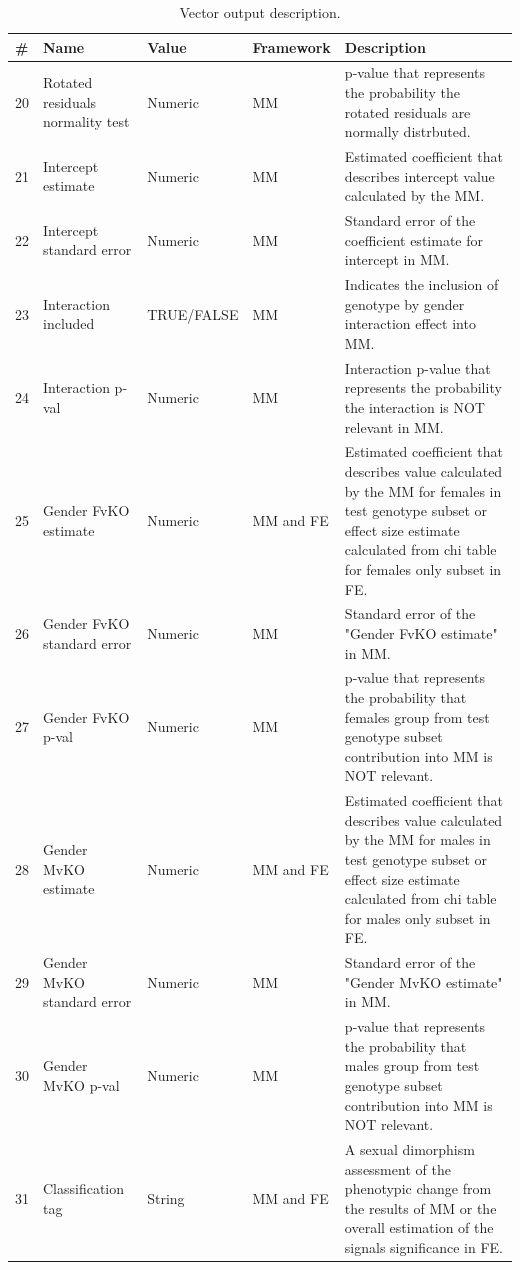 \documentclass[12pt,a4paper]{article}
\begin{document}
\begin{table}
 
\begin{tabular}{| l | l | l | l | p{10cm} |}
  \hline
\#&Name&Value&Framework&Description\\\hline
20&Rotated residuals normality test&Numeric&MM&p-value that represents the probability the rotated residuals are normally distrbuted.\\
21&Intercept estimate&Numeric&MM&Estimated coefficient that describes intercept value calculated by the MM.\\
22&Intercept standard error&Numeric&MM&Standard error of the coefficient estimate for intercept in MM.\\
23&Interaction included&TRUE/FALSE&MM&Indicates the inclusion of genotype by gender interaction effect into MM.\\
24&Interaction p-val&Numeric&MM&Interaction p-value that represents the probability the interaction is NOT relevant in MM.\\
25&Gender FvKO estimate&Numeric&MM and FE&Estimated coefficient that describes value calculated by the MM for females in test genotype subset or effect size estimate calculated from chi table for females only subset in FE.\\
26&Gender FvKO standard error&Numeric&MM&Standard error of the "Gender FvKO estimate" in MM.\\
27&Gender FvKO p-val&Numeric&MM&p-value that represents the probability that females group from test genotype subset contribution into MM is NOT relevant.\\
28&Gender MvKO estimate&Numeric&MM and FE&Estimated coefficient that describes value calculated by the MM for males in test genotype subset or effect size estimate calculated from chi table for males only subset in FE.\\
29&Gender MvKO standard error&Numeric&MM&Standard error of the "Gender MvKO estimate" in MM.\\
30&Gender MvKO p-val&Numeric&MM&p-value that represents the probability that males group from test genotype subset contribution into MM is NOT relevant.\\
31&Classification tag&String&MM and FE&A sexual dimorphism assessment of the phenotypic change from the results of MM or the overall estimation of the signals significance in FE.\\
\hline  
\end{tabular}
\caption{Vector output description.}\label{table:07}
\end{table}
\end{document}
